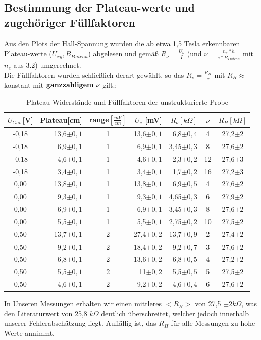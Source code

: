 \documentclass[10pt,a4paper]{article}
\begin{document}
	\subsection{ Bestimmung der Plateau-werte  und zugehöriger Füllfaktoren}
	Aus den Plots der Hall-Spannung wurden die ab etwa 1,5 Tesla erkennbaren Plateau-werte ($ U_{xy} , B_{Plateau} $) abgelesen und gemäß $ R_\nu = \frac{U_\nu}{I} $ (und $ \nu = \frac{n_e * h}{e * B_{Plateau}} $  mit $ n_e $ aus 3.2) umgerechnet.\\ Die Füllfaktoren wurden schließlich derart gewählt, so das $ R_\nu = \frac{R_H}{\nu}$ mit $ R_H \approx $ konstant mit $\bf ganzzahligem \ \nu \rm $ gilt.:
	\begin{table}[H]
 	\caption{Plateau-Widerstände und Füllfaktoren der unstrukturierte Probe}
	\begin{tabular}{|c|r|c|r|r|c|c|}
	\hline 
    $U_{Gat.}$[V] & Plateau[cm]  & range$\left[\frac{mV}{cm}\right]$ & $ U_\nu $ [mV] & $ R_\nu [k\Omega] $ & $ \nu $ & $ R_H [k\Omega] $\\ 
	\hline \hline
	-0,18 & 13,6$ \pm0,1 $ & 1 & 13,6$ \pm0,1 $ & 6,8$ \pm0,4 $ & 4 & 27,2$ \pm2 $\\ 
	\hline 
	-0,18 & 6,9$ \pm0,1 $ & 1 & 6,9$ \pm0,1 $ & 3,45$ \pm0,3 $ & 8 & 27,6$ \pm2 $\\ 
	\hline 
	-0,18 & 4,6$ \pm0,1 $ & 1 & 4,6$ \pm0,1 $ & 2,3$ \pm0,2 $ & 12 & 27,6$ \pm3 $\\ 
	\hline 
	-0,18 & 3,4$ \pm0,1 $ & 1 & 3,4$ \pm0,1 $ & 1,7$ \pm0,2 $ & 16 & 27,2$ \pm3 $\\ 
	\hline \hline
	0,00 & 13,8$ \pm0,1 $ & 1 & 13,8$ \pm0,1 $ & 6,9$ \pm0,5 $ & 4 & 27,6$ \pm2 $\\ 
	\hline 
	0,00 & 9,3$ \pm0,1 $ & 1 & 9,3$ \pm0,1 $ & 4,65$ \pm0,3 $ & 6 & 27,9$ \pm2 $\\ 
	\hline 
	0,00 & 6,9$ \pm0,1 $ & 1 & 6,9$ \pm0,1 $ & 3,45$ \pm0,3 $ & 8 & 27,6$ \pm2 $\\ 
	\hline 
	0,00 & 5,5$ \pm0,1 $ & 1 & 5,5$ \pm0,1 $ & 2,75$ \pm0,2 $ & 10 & 27,5$ \pm2 $\\ 
	\hline \hline
	0,50 & 13,7$ \pm0,1 $ & 2 & 27,4$ \pm0,2 $ & 13,7$ \pm0,9 $ & 2 & 27,4$ \pm2 $\\ 
	\hline 
	0,50 & 9,2$ \pm0,1 $ & 2 & 18,4$ \pm0,2 $ & 9,2$ \pm0,7 $ & 3 & 27,6$ \pm2 $\\ 
	\hline 
	0,50 & 6,8$ \pm0,1 $ & 2 & 13,6$ \pm0,2 $ & 6,8$ \pm0,5 $ & 4 & 27,2$ \pm2 $\\ 
	\hline 
	0,50 & 5,5$ \pm0,1 $ & 2 & 11$ \pm0,2 $ & 5,5$ \pm0,5 $ & 5 & 27,5$ \pm2 $\\ 
	\hline 
	0,50 & 4,6$ \pm0,1 $ & 2 & 9,2$ \pm0,2 $ & 4,6$ \pm0,4 $ & 6 & 27,6$ \pm2 $\\ 
	\hline 
	\end{tabular}
	\end{table}
	In Unseren Messungen erhalten wir einen mittleres $ <R_H> $ von 27,5 $\pm2 k\Omega $, was den Literaturwert von 25,8 $ k\Omega $ deutlich überschreitet, welcher jedoch innerhalb unserer Fehlerabschätzung liegt. Auffällig ist, das $ R_H $ für alle Messungen zu hohe Werte annimmt.\\ 
\end{document}

